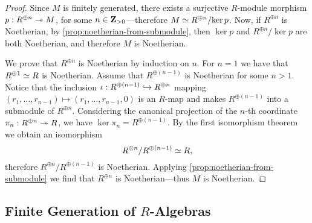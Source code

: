 \begin{proof}
    Since \(M\) is finitely generated, there exists a surjective \(R\)-module
    morphism \(p: R^{\oplus n} \twoheadrightarrow M\), for some \(n \in \mathbf{Z}_{> 0}\)---therefore
    \(M \simeq R^{\oplus n}/{\ker p}\). Now, if \(R^{\oplus n}\) is Noetherian, by
    \cref{prop:noetherian-from-submodule}, then \(\ker p\) and \(R^{\oplus n}/{\ker
    p}\) are both Noetherian, and therefore \(M\) is Noetherian.

    We prove that \(R^{\oplus n}\) is Noetherian by induction on \(n\). For
    \(n = 1\) we have that \(R^{\oplus 1} \simeq R\) is Noetherian. Assume that
    \(R^{\oplus(n - 1)}\) is Noetherian for some \(n > 1\). Notice that the
    inclusion \(\iota: R^{\oplus (n-1)} \hookrightarrow R^{\oplus n}\) mapping
    \((r_1, \dots, r_{n-1}) \mapsto (r_1, \dots, r_{n-1}, 0)\) is an \(R\)-map and
    makes \(R^{\oplus (n-1)}\) into a submodule of \(R^{\oplus n}\). Considering the
    canonical projection of the \(n\)-th coordinate \(\pi_n: R^{\oplus n} \twoheadrightarrow R\),
    we have \(\ker \pi_n = R^{\oplus (n - 1)}\). By the first isomorphism theorem we
    obtain an isomorphism
    \[
        R^{\oplus n}/R^{\oplus (n-1)} \simeq R,
    \]
    therefore \(R^{\oplus n}/R^{\oplus (n-1)}\) is Noetherian. Applying
    \cref{prop:noetherian-from-submodule} we find that \(R^{\oplus n}\) is
    Noetherian---thus \(M\) is Noetherian.
\end{proof}

\subsection{Finite Generation of \texorpdfstring{\(R\)}{R}-Algebras}

